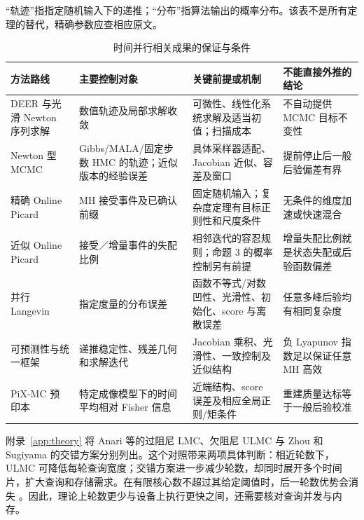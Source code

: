 \documentclass[UTF8,a4paper,zihao=-4,fontset=fandol]{ctexart}
\begin{document}
\begin{table}[htbp]
\centering{}
\caption{时间并行相关成果的保证与条件}\label{tab:2}
\parbox{\linewidth}{\footnotesize “轨迹”指指定随机输入下的递推；“分布”指算法输出的概率分布。该表不是所有定理的替代，精确参数应查相应原文。}\par\smallskip
\begin{tabular}{@{}>{\raggedright\arraybackslash}p{}>{\raggedright\arraybackslash}p{}>{\raggedright\arraybackslash}p{}>{\raggedright\arraybackslash}p{}@{}}
\toprule
方法路线 & 主要控制对象 & 关键前提或机制 & 不能直接外推的结论 \\
\midrule
DEER 与光滑 Newton 序列求解 \cite{lim2024} & 数值轨迹及局部求解收敛 & 可微性、线性化系统求解及适当初值；扫描成本 & 不自动提供 MCMC 目标不变性 \\[4pt]
Newton 型 MCMC \cite{zoltowski2025} & Gibbs/MALA/固定步数 HMC 的轨迹；近似版本的经验误差 & 具体采样器适配、Jacobian 近似、容差及窗口 & 提前停止后一般后验偏差有界 \\[4pt]
精确 Online Picard \cite{grazzi2026} & MH 接受事件及已确认前缀 & 固定随机输入；复杂度定理有目标正则性和尺度条件 & 无条件的维度加速或快速混合 \\[4pt]
近似 Online Picard \cite{grazzi2026} & 接受／增量事件的失配比例 & 相邻迭代的容忍规则；命题 3 的概率控制另有前提 & 增量失配比例就是状态失配或后验函数偏差 \\[4pt]
并行 Langevin \cite{anari2024,zhou2025parallel} & 指定度量的分布误差 & 函数不等式/对数凹性、光滑性、初始化、score 与离散误差 & 任意多峰后验均有相同复杂度 \\[4pt]
可预测性与统一框架 \cite{gonzalez2025predict,gonzalez2026} & 递推稳定性、残差几何和求解迭代 & Jacobian 乘积、光滑性、一致控制及近似结构 & 负 Lyapunov 指数足以保证任意 MH 高效 \\[4pt]
PiX-MC 预印本 \cite{wei2026} & 特定成像模型下的时间平均相对 Fisher 信息 & 近端结构、score 误差及相应全局正则/矩条件 & 重建质量达标等于一般后验校准 \\[4pt]
\bottomrule
\end{tabular}
\end{table}

附录~\ref{app:theory} 将 Anari 等的过阻尼 LMC、欠阻尼 ULMC 与 Zhou 和 Sugiyama 的交错方案分别列出。这个对照带来两项具体判断：相近轮数下，ULMC 可降低每轮查询宽度；交错方案进一步减少轮数，却同时展开多个时间片，扩大查询和存储需求。在有限核心数不超过其给定阈值时，后一轮数优势会消失 \cite{anari2024,zhou2025parallel}。因此，理论上轮数更少与设备上执行更快之间，还需要核对查询并发与内存。
\end{document}
